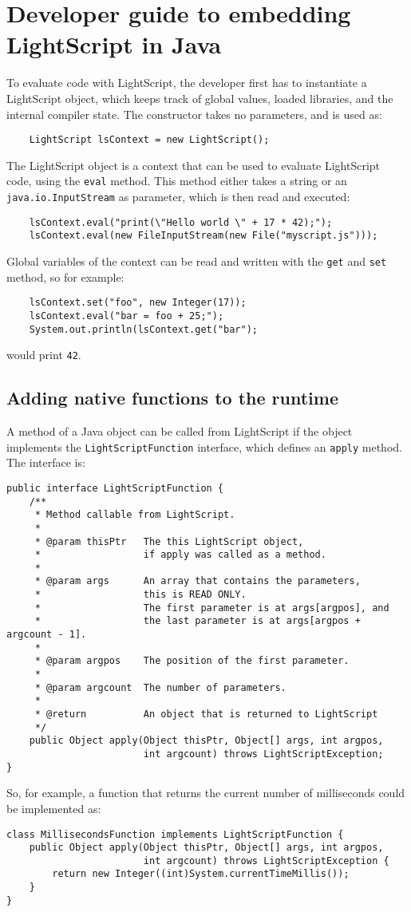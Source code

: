 \documentclass[11pt]{report}
\begin{document}
\section{Developer guide to embedding LightScript in Java}
To evaluate code with LightScript, the developer first has to instantiate a LightScript object, which keeps track of global values, loaded libraries, and the internal compiler state. The constructor takes no parameters, and is used as:
\begin{lstlisting}
    LightScript lsContext = new LightScript();
\end{lstlisting}
The LightScript object is a context that can be used to evaluate LightScript code, using the \verb|eval| method. This method either takes a string or an \verb|java.io.InputStream| as parameter, which is then read and executed:
\begin{lstlisting}
    lsContext.eval("print(\"Hello world \" + 17 * 42);");
    lsContext.eval(new FileInputStream(new File("myscript.js")));
\end{lstlisting}
Global variables of the context can be read and written with the \verb|get| and \verb|set| method, so for example:
\begin{lstlisting}
    lsContext.set("foo", new Integer(17));
    lsContext.eval("bar = foo + 25;");
    System.out.println(lsContext.get("bar");
\end{lstlisting}
would print \verb|42|.

\subsection{Adding native functions to the runtime}

A method of a Java object can be called from LightScript if the object implements the \verb|LightScriptFunction| interface, which defines an \verb|apply| method.
The interface is:
\begin{lstlisting}
public interface LightScriptFunction {
    /** 
     * Method callable from LightScript.
     *
     * @param thisPtr   The this LightScript object, 
     *                  if apply was called as a method.
     *
     * @param args      An array that contains the parameters,
     *                  this is READ ONLY.
     *                  The first parameter is at args[argpos], and 
     *                  the last parameter is at args[argpos + argcount - 1].
     *
     * @param argpos    The position of the first parameter.
     *
     * @param argcount  The number of parameters.
     *
     * @return          An object that is returned to LightScript
     */
    public Object apply(Object thisPtr, Object[] args, int argpos, 
                        int argcount) throws LightScriptException;
}
\end{lstlisting}
So, for example, a function that returns the current number of milliseconds could be implemented as:
\begin{lstlisting}
class MillisecondsFunction implements LightScriptFunction {
    public Object apply(Object thisPtr, Object[] args, int argpos, 
                        int argcount) throws LightScriptException {
        return new Integer((int)System.currentTimeMillis());
    }
}
\end{lstlisting}
\end{document}
